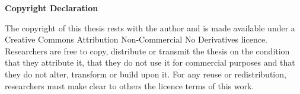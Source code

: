 \begin{center}
    \large\bf Copyright Declaration
\end{center}
\small
\linespread{1.5}
\normalsize
The copyright of this thesis rests with the author and is made available under a
Creative Commons Attribution Non-Commercial No Derivatives licence. Researchers
are free to copy, distribute or transmit the thesis on the condition that they
attribute it, that they do not use it for commercial purposes and that they do
not alter, transform or build upon it. For any reuse or redistribution,
researchers must make clear to others the licence terms of this work.
\par
